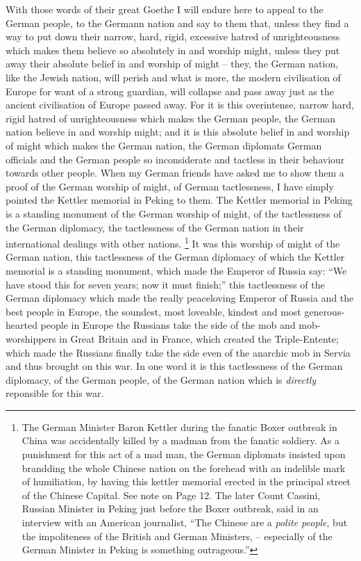 With those words of their great Goethe I will endure here to appeal to the German people, to the Germann nation and say to them that,
unless they find a way to put down their narrow, hard, rigid, excessive hatred of unrighteousness which makes them believe so absolutely in and worship might,
unless they put away their absolute belief in and worship of might -- they, the German nation, like the Jewish nation, will perish and what is more,
the modern civilisation of Europe for want of a strong guardian, will collapse and pass away just as the ancient civilisation of Europe passed away.
For it is this overintense, narrow hard, rigid hatred of unrighteousness which makes the German people, the German nation believe in and worship might;
and it is this absolute belief in and worship of might which makes the German nation, the German diplomats German officials and the German people so inconsiderate and tactless in their behaviour towards other people.
When my German friends have asked me to show them a proof of the German worship of might, of German tactlessness, I have simply pointed the Kettler memorial in Peking to them.
The Kettler memorial in Peking is a standing monument of the German worship of might, of the tactlessness of the German diplomacy,
the tactlessness of the German nation in their international dealings with other nations.
\footnote{The German Minister Baron Kettler during the fanatic Boxer outbreak in China was accidentally killed by a madman from the fanatic soldiery.
As a punishment for this act of a mad man, the German diplomats insisted upon brandding the whole Chinese nation on the forehead with an indelible mark of humiliation, by having this kettler memorial erected in the principal street of the Chinese Capital.
See note on Page 12. The later Count Cassini, Russian Minister in Peking just before the Boxer outbreak, said in an interview with an American journalist,
``The Chinese are a \emph{polite people}, but the impoliteness of the British and German Ministers, -- especially of the German Minister in Peking is something outrageous.''
}
It was this worship of might of the German nation, this tactlessness of the German diplomacy of which the Kettler memorial is a standing monument, which made the Emperor of Russia say: ``We have stood this for seven years; now it must finish;''
this tactlessness of the German diplomacy which made the really peaceloving Emperor of Russia and the best people in Europe,
the soundest, most loveable, kindest and most generous-hearted people in Europe the Russians take the side of the mob and mob-worshippers in Great Britain and in France, which created the Triple-Entente;
which made the Russians finally take the side even of the anarchic mob in Servia and thus brought on this war.
In one word it is this tactlessness of the German diplomacy, of the German people, of the German nation which is \emph{directly} reponsible for this war.

